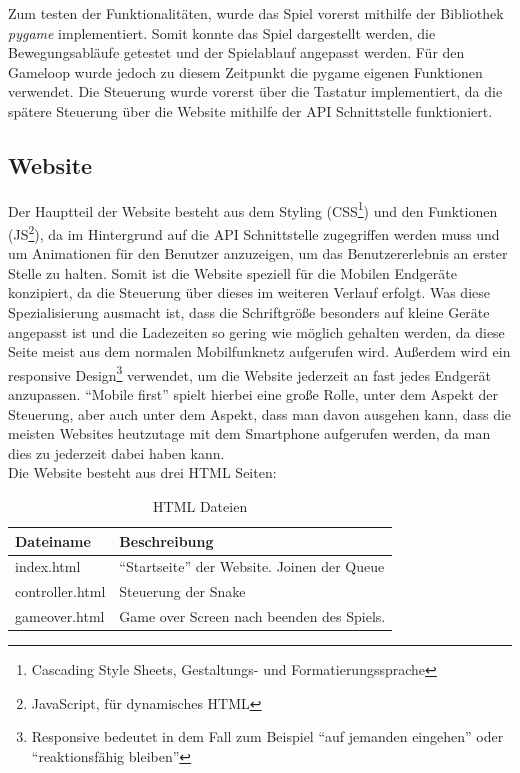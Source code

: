 \documentclass[a4paper,12pt]{scrartcl}
\begin{document}
Zum testen der Funktionalitäten, wurde das Spiel vorerst mithilfe der Bibliothek \textit{pygame} implementiert. Somit konnte das Spiel dargestellt werden, die Bewegungsabläufe getestet und der Spielablauf angepasst werden. Für den Gameloop wurde jedoch zu diesem Zeitpunkt die pygame eigenen Funktionen verwendet. Die Steuerung wurde vorerst über die Tastatur implementiert, da die spätere Steuerung über die Website mithilfe der API Schnittstelle funktioniert.

\subsection{Website}
Der Hauptteil der Website besteht aus dem Styling (CSS\footnote{Cascading Style Sheets, Gestaltungs- und Formatierungssprache}) und den Funktionen (JS\footnote{JavaScript, für dynamisches HTML}), da im Hintergrund auf die API Schnittstelle zugegriffen werden muss und um Animationen für den Benutzer anzuzeigen, um das Benutzererlebnis an erster Stelle zu halten. Somit ist die Website speziell für die Mobilen Endgeräte konzipiert, da die Steuerung über dieses im weiteren Verlauf erfolgt. Was diese Spezialisierung ausmacht ist, dass die Schriftgröße besonders auf kleine Geräte angepasst ist und die Ladezeiten so gering wie möglich gehalten werden, da diese Seite meist aus dem normalen Mobilfunknetz aufgerufen wird. Außerdem wird ein responsive Design\footnote{Responsive bedeutet in dem Fall zum Beispiel ``auf jemanden eingehen'' oder ``reaktionsfähig bleiben''} verwendet, um die Website jederzeit an fast jedes Endgerät anzupassen. ``Mobile first'' spielt hierbei eine große Rolle, unter dem Aspekt der Steuerung, aber auch unter dem Aspekt, dass man davon ausgehen kann, dass die meisten Websites heutzutage mit dem Smartphone aufgerufen werden, da man dies zu jederzeit dabei haben kann. \\
Die Website besteht aus drei HTML Seiten:

\begin{table}[!htb]
\centering
\begin{tabular}{p{4cm}|p{4cm}}
Dateiname & Beschreibung \\
\hline
index.html & ``Startseite'' der Website. Joinen der Queue \\
controller.html & Steuerung der Snake \\
gameover.html & Game over Screen nach beenden des Spiels.
\end{tabular}
\caption{HTML Dateien}
\end{table}
\end{document}
